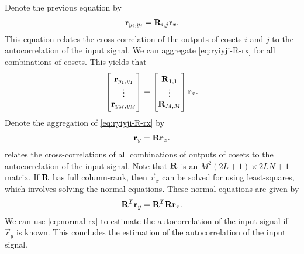 \documentclass[a4paper, openany, oneside]{memoir}
\begin{document}
Denote the previous equation by
\begin{align} \label{eq:ryiyji-R-rx}
    \boldsymbol{\mathbf{r}}_{y_i,y_j} = \boldsymbol{\mathbf{R}}_{i,j} \boldsymbol{\mathbf{r}}_x.
\end{align}
This equation relates the cross-correlation of the outputs of cosets $i$ and $j$ to the autocorrelation of the input signal. We can aggregate \cref{eq:ryiyji-R-rx} for all combinations of cosets. This yields that
\begin{align*}
    \begin{bmatrix}
        \boldsymbol{\mathbf{r}}_{y_1,y_1} \\
        \vdots \\
        \boldsymbol{\mathbf{r}}_{y_M,y_M}
    \end{bmatrix} = \begin{bmatrix}
        \boldsymbol{\mathbf{R}}_{1,1} \\
        \vdots \\
        \boldsymbol{\mathbf{R}}_{M,M}
    \end{bmatrix} \boldsymbol{\mathbf{r}}_x.
\end{align*}
Denote the aggregation of \cref{eq:ryiyji-R-rx} by
\begin{align} \label{eq:ry-R-rx}
    \boldsymbol{\mathbf{r}}_y = \boldsymbol{\mathbf{R}} \boldsymbol{\mathbf{r}}_x.
\end{align}
 relates the cross-correlations of all combinations of outputs of cosets to the autocorrelation of the input signal. Note that $\boldsymbol{\mathbf{R}}$ is an $M^2(2L+1) \times 2LN+1$ matrix. If $\boldsymbol{\mathbf{R}}$ has full column-rank, then $\vec{r}_x$ can be solved for using least-squares, which involves solving the normal equations. These normal equations are given by
\begin{align} \label{eq:normal-rx}
    \boldsymbol{\mathbf{R}}^T \boldsymbol{\mathbf{r}}_y = \boldsymbol{\mathbf{R}}^T \boldsymbol{\mathbf{R}} \boldsymbol{\mathbf{r}}_x.
\end{align}
We can use \cref{eq:normal-rx} to estimate the autocorrelation of the input signal if $\vec{r}_y$ is known. This concludes the estimation of the autocorrelation of the input signal.
\end{document}
